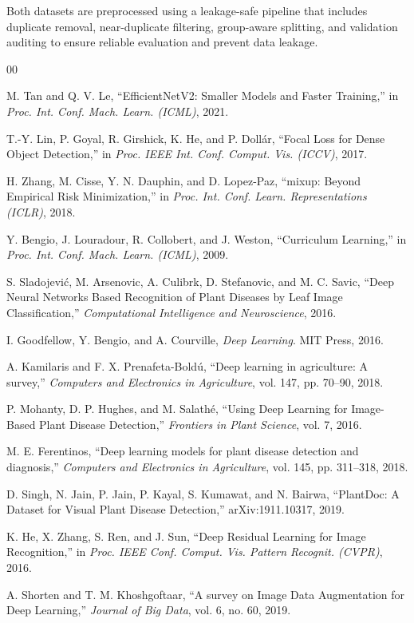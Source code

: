 \documentclass[12pt,a4paper]{report}
\begin{document}
Both datasets are preprocessed using a leakage-safe pipeline that includes duplicate removal, near-duplicate filtering, group-aware splitting, and validation auditing to ensure reliable evaluation and prevent data leakage.

\begin{thebibliography}{00}

M. Tan and Q. V. Le,
``EfficientNetV2: Smaller Models and Faster Training,''
in \textit{Proc. Int. Conf. Mach. Learn. (ICML)}, 2021.

T.-Y. Lin, P. Goyal, R. Girshick, K. He, and P. Doll\'ar,
``Focal Loss for Dense Object Detection,''
in \textit{Proc. IEEE Int. Conf. Comput. Vis. (ICCV)}, 2017.

H. Zhang, M. Cisse, Y. N. Dauphin, and D. Lopez-Paz,
``mixup: Beyond Empirical Risk Minimization,''
in \textit{Proc. Int. Conf. Learn. Representations (ICLR)}, 2018.

Y. Bengio, J. Louradour, R. Collobert, and J. Weston,
``Curriculum Learning,''
in \textit{Proc. Int. Conf. Mach. Learn. (ICML)}, 2009.

S. Sladojevi\'c, M. Arsenovic, A. Culibrk, D. Stefanovic, and M. C. Savic,
``Deep Neural Networks Based Recognition of Plant Diseases by Leaf Image Classification,''
\textit{Computational Intelligence and Neuroscience}, 2016.

I. Goodfellow, Y. Bengio, and A. Courville, \textit{Deep Learning}. MIT Press, 2016.

A. Kamilaris and F. X. Prenafeta-Bold\'u,
``Deep learning in agriculture: A survey,''
\textit{Computers and Electronics in Agriculture}, vol. 147, pp. 70--90, 2018.

P. Mohanty, D. P. Hughes, and M. Salath\'e,
``Using Deep Learning for Image-Based Plant Disease Detection,''
\textit{Frontiers in Plant Science}, vol. 7, 2016.

M. E. Ferentinos,
``Deep learning models for plant disease detection and diagnosis,''
\textit{Computers and Electronics in Agriculture}, vol. 145, pp. 311--318, 2018.

D. Singh, N. Jain, P. Jain, P. Kayal, S. Kumawat, and N. Bairwa,
``PlantDoc: A Dataset for Visual Plant Disease Detection,''
arXiv:1911.10317, 2019.

K. He, X. Zhang, S. Ren, and J. Sun,
``Deep Residual Learning for Image Recognition,''
in \textit{Proc. IEEE Conf. Comput. Vis. Pattern Recognit. (CVPR)}, 2016.

A. Shorten and T. M. Khoshgoftaar,
``A survey on Image Data Augmentation for Deep Learning,''
\textit{Journal of Big Data}, vol. 6, no. 60, 2019.

\end{thebibliography}
\end{document}
